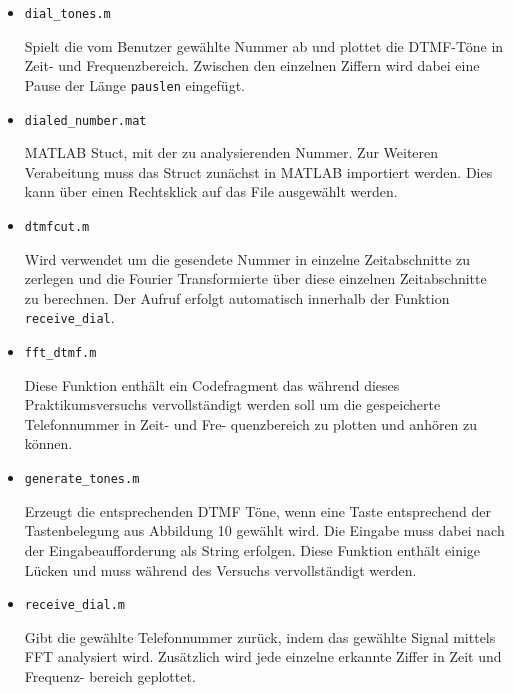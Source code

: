 \documentclass[10pt]{report}
\begin{document}
        \begin{itemize}
            \item \texttt{dial\_tones.m}

                Spielt die vom Benutzer gewählte Nummer ab und plottet die DTMF-Töne in Zeit-
                und Frequenzbereich. Zwischen den einzelnen Ziffern wird dabei eine Pause der
                Länge \texttt{pauslen} eingefügt.

            \item \texttt{dialed\_number.mat}

                MATLAB Stuct, mit der zu analysierenden Nummer. Zur Weiteren Verabeitung
                muss das Struct zunächst in MATLAB importiert werden. Dies kann über einen
                Rechtsklick auf das File ausgewählt werden.

            \item \texttt{dtmfcut.m}

                Wird verwendet um die gesendete Nummer in einzelne Zeitabschnitte zu zerlegen
                und die Fourier Transformierte über diese einzelnen Zeitabschnitte zu berechnen.
                Der Aufruf erfolgt automatisch innerhalb der Funktion \texttt{receive\_dial}.

            \item \texttt{fft\_dtmf.m}

                Diese Funktion enthält ein Codefragment das während dieses Praktikumsversuchs
                vervollständigt werden soll um die gespeicherte Telefonnummer in Zeit- und Fre-
                quenzbereich zu plotten und anhören zu können.

            \item \texttt{generate\_tones.m}

                Erzeugt die entsprechenden DTMF Töne, wenn eine Taste entsprechend der Tastenbelegung aus Abbildung 10 gewählt wird. Die Eingabe muss dabei nach der
                Eingabeaufforderung als String erfolgen. Diese Funktion enthält einige Lücken und muss während des Versuchs
                vervollständigt werden.

            \item \texttt{receive\_dial.m}

                Gibt die gewählte Telefonnummer zurück, indem das gewählte Signal mittels FFT
                analysiert wird. Zusätzlich wird jede einzelne erkannte Ziffer in Zeit und Frequenz-
                bereich geplottet.
        \end{itemize}
\end{document}
